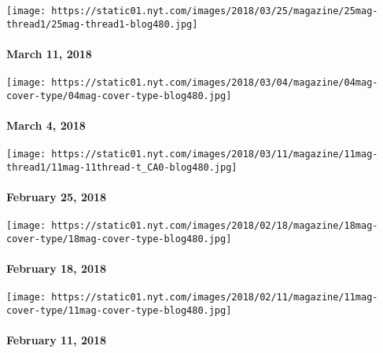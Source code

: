 \href{https://www.nytimes.com/interactive/2018/03/08/magazine/25-songs-future-of-music.html}{}

\texttt{[image: https://static01.nyt.com/images/2018/03/25/magazine/25mag-thread1/25mag-thread1-blog480.jpg]}

\hypertarget{march-11-2018}{%
\paragraph{March 11, 2018}\label{march-11-2018}}

\href{https://www.nytimes.com/issue/magazine/2018/03/30/3418-issue}{}

\texttt{[image: https://static01.nyt.com/images/2018/03/04/magazine/04mag-cover-type/04mag-cover-type-blog480.jpg]}

\hypertarget{march-4-2018}{%
\paragraph{March 4, 2018}\label{march-4-2018}}

\href{https://www.nytimes.com/issue/magazine/2018/03/30/022518}{}

\texttt{[image: https://static01.nyt.com/images/2018/03/11/magazine/11mag-thread1/11mag-11thread-t\_CA0-blog480.jpg]}

\hypertarget{february-25-2018}{%
\paragraph{February 25, 2018}\label{february-25-2018}}

\href{https://www.nytimes.com/issue/magazine/2018/02/16/21818-issue}{}

\texttt{[image: https://static01.nyt.com/images/2018/02/18/magazine/18mag-cover-type/18mag-cover-type-blog480.jpg]}

\hypertarget{february-18-2018}{%
\paragraph{February 18, 2018}\label{february-18-2018}}

\href{https://www.nytimes.com/issue/magazine/2018/02/09/21118-issue}{}

\texttt{[image: https://static01.nyt.com/images/2018/02/11/magazine/11mag-cover-type/11mag-cover-type-blog480.jpg]}

\hypertarget{february-11-2018}{%
\paragraph{February 11, 2018}\label{february-11-2018}}

